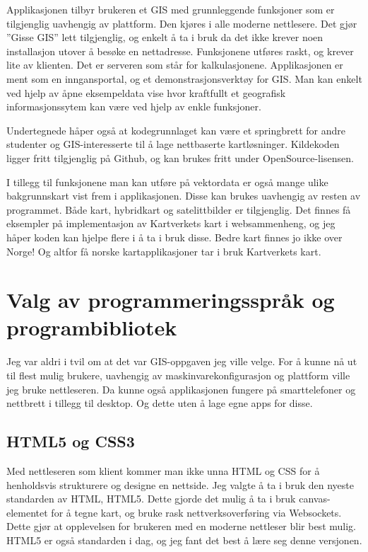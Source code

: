 \documentclass[12pt,twoside,onecolumn]{article}
\begin{document}
	Applikasjonen tilbyr brukeren et GIS med grunnleggende funksjoner som er tilgjenglig uavhengig av plattform. Den kjøres i alle moderne nettlesere. Det gjør ''Gisse GIS'' lett tilgjenglig, og enkelt å ta i bruk da det ikke krever noen installasjon utover å besøke en nettadresse. Funksjonene utføres raskt, og krever lite av klienten. Det er serveren som står for kalkulasjonene. Applikasjonen er ment som en inngansportal, og et demonstrasjonsverktøy for GIS. Man kan enkelt ved hjelp av åpne eksempeldata vise hvor kraftfullt et geografisk informasjonssytem kan være ved hjelp av enkle funksjoner. 
	
	Undertegnede håper også at kodegrunnlaget kan være et springbrett for andre studenter og GIS-interesserte til å lage nettbaserte kartløsninger. Kildekoden ligger fritt tilgjenglig på Github, og kan brukes fritt under OpenSource-lisensen. 
	
	I tillegg til funksjonene man kan utføre på vektordata er også mange ulike bakgrunnskart vist frem i applikasjonen. Disse kan brukes uavhengig av resten av programmet. Både kart, hybridkart og satelittbilder er tilgjenglig. Det finnes få eksempler på implementasjon av Kartverkets kart i websammenheng, og jeg håper koden kan hjelpe flere i å ta i bruk disse. Bedre kart finnes jo ikke over Norge! Og altfor få norske kartapplikasjoner tar i bruk Kartverkets kart. 

\section{Valg av programmeringsspråk og programbibliotek}
	
	Jeg var aldri i tvil om at det var GIS-oppgaven jeg ville velge. For å kunne nå ut til flest mulig brukere, uavhengig av maskinvarekonfigurasjon og plattform ville jeg bruke nettleseren. Da kunne også applikasjonen fungere på smarttelefoner og nettbrett i tillegg til desktop. Og dette uten å lage egne apps for disse.
	
	\subsection{HTML5 og CSS3}
		
		Med nettleseren som klient kommer man ikke unna HTML og CSS for å henholdsvis strukturere og designe en nettside. Jeg valgte å ta i bruk den nyeste standarden av HTML, HTML5. Dette gjorde det mulig å ta i bruk canvas-elementet for å tegne kart, og bruke rask nettverksoverføring via Websockets. Dette gjør at opplevelsen for brukeren med en moderne nettleser blir best mulig. HTML5 er også standarden i dag, og jeg fant det best å lære seg denne versjonen.
		
\end{document}

